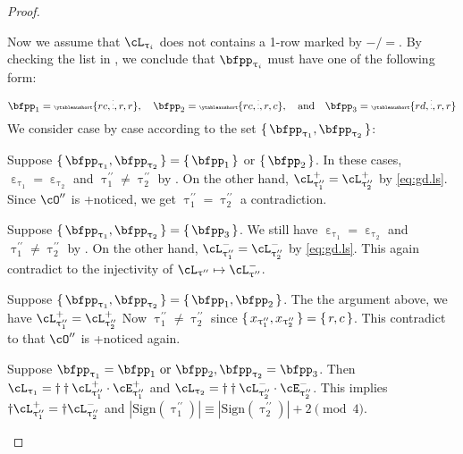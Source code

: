 \documentclass[12pt,a4paper]{amsart}
\def\abs#1{\left|{#1}\right|}
\def\DD{\nabla}
\numberwithin{equation}{section}
\theoremstyle{remark}
\def\ssign{\mathrm{Sign}}
\let\ytb=\ytableaushort
\newcommand{\tytb}[1]{{\tiny\ytb{#1}}}
\def\cOpp{\cO^{\prime\prime}}
\def\pcL{\cL^+}
\def\ncL{\cL^-}
\def\pcE{\cE^+}
\def\ncE{\cE^-}
\def\uptaup{\uptau^{\prime}}
\def\uptaupp{\uptau^{\prime\prime}}
\begin{document}
\begin{proof}
\begin{enumPF}
\item
Now we assume that $\cL_{\uptau_{i}}$ does not contains a 1-row marked by $-/=$.
By checking the list in , we conclude that
$\bfpp_{\uptau_{i}}$ must have one of the following form:
  \[
    \bfpp_{1} =\tytb{rc,\vdots,r,r}, \quad \bfpp_{2}=\tytb{rc,\vdots,r,c}, \quad\text{and}
    \quad\bfpp_{3}= \tytb{rd,\vdots,r,r}\\
  \]
  We consider case by case according to the set $\set{\bfpp_{\uptau_{1}},\bfpp_{\uptau_{2}}}$:
  \begin{enumPF}
    \item Suppose
    $\set{\bfpp_{\uptau_{1}},\bfpp_{\uptau_{2}}}=\set{\bfpp_{1}}$ or $ \set{\bfpp_{2}}$.
    In these cases, $\upepsilon_{\uptau_{1}}=\upepsilon_{\uptau_{2}}$ and
    $\uptaupp_{1}\neq \uptaupp_{2}$ by .
    On the other hand, $\pcL_{\uptaupp_{1}}=\pcL_{\uptaupp_{2}}$ by \eqref{eq:gd.ls}.
    Since $\cOpp$ is +noticed, we get $\uptaupp_{1}=\uptaupp_{2}$ a contradiction.
    \item Suppose
    $\set{\bfpp_{\uptau_{1}},\bfpp_{\uptau_{2}}}=\set{\bfpp_{3}}$.
    We still have $\upepsilon_{\uptau_{1}}=\upepsilon_{\uptau_{2}}$ and
    $\uptaupp_{1}\neq \uptaupp_{2}$ by .
    On the other hand, $\ncL_{\uptaupp_{1}}=\ncL_{\uptaupp_{2}}$ by \eqref{eq:gd.ls}.
    This again contradict to the injectivity of $\cL_{\uptaupp}\mapsto \ncL_{\uptaupp}$.
    \item  Suppose
    $\set{\bfpp_{\uptau_{1}},\bfpp_{\uptau_{2}}} = \set{\bfpp_{1},\bfpp_{2}}$.
    The the argument above, we have $\pcL_{\uptaupp_{1}}=\pcL_{\uptaupp_{2}}$
    Now $\uptaupp_{1}\neq \uptaupp_{2}$ since $\set{x_{\uptaupp_{1}},x_{\uptaupp_{2}}}=\set{r,c}$.
    This contradict to that $\cOpp$ is +noticed again.
    \item\label{it:c:noticed.bij.4} Suppose $\bfpp_{\uptau_{1}} = \bfpp_{1} \text{ or } \bfpp_{2}, \bfpp_{\uptau_{2}}=\bfpp_{3}$.
    Then
    $\cL_{\uptau_{1}} = \dagger\dagger\pcL_{\uptaupp_{1}}\cdot \pcE_{\uptaupp_{1}}$
    and
    $\cL_{\uptau_{2}} = \dagger\dagger\ncL_{\uptaupp_{2}}\cdot \ncE_{\uptaupp_{2}}$.
    This implies
    $\dagger \pcL_{\uptaupp_{1}}= \dagger\ncL_{\uptaupp_{2}}$ and
    $\abs{\ssign(\uptaupp_{1})} \equiv \abs{\ssign(\uptaupp_{2})}+2 \pmod{4}$.


\end{enumPF}
\end{enumPF}
\end{proof}
\end{document}

